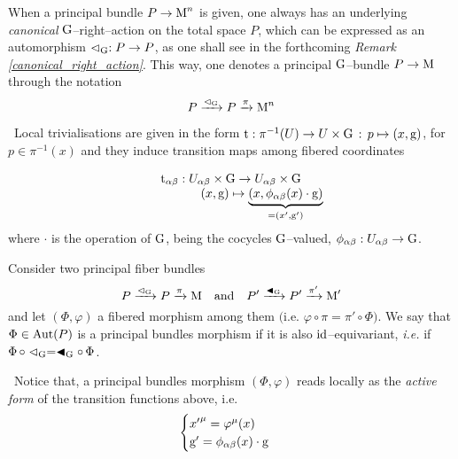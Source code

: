 \begin{note}
    When a principal bundle $P\to\text{\normalfont M}^n$ is given, one always has an underlying \emph{canonical} $\text{\normalfont G}$--right--action on the total space $P$, which can be expressed as an automorphism $\vartriangleleft_{\text{\normalfont G}}:P\to P$, as one shall see in the forthcoming \emph{Remark \ref{canonical_right_action}}. This way, one denotes a principal $\text{\normalfont G}$--bundle $P\to\text{\normalfont M}$ through the notation
    $$P\xrightarrow[]{\vartriangleleft_{\text{\normalfont G}}}P\xrightarrow{\pi}\text{\normalfont M}^n$$
\end{note}

    
\,\newline
Local trivialisations are given in the form $\text{\normalfont t}:\pi^{-1}(U)\to U\times\text{\normalfont G}\,:\,p\mapsto(x,\text{\normalfont g})$, for $p\in\pi^{-1}(x)$ and they induce transition maps among fibered coordinates 

\begin{equation}\label{princ_trans_maps}
    \begin{matrix}
    \text{\normalfont t}_{\alpha\beta}:U_{\alpha\beta}\times\text{\normalfont G}\to U_{\alpha\beta}\times\text{\normalfont G}\\
    \qquad\qquad\quad(x,\text{\normalfont g})\mapsto\underbrace{\left(x,\phi_{\alpha\beta}(x)\cdot\text{\normalfont g}\right)}_{=(x',\text{\normalfont g}')}
\end{matrix}
\end{equation}
where $\cdot$ is the operation of $\text{\normalfont G}$, being the cocycles $\text{\normalfont G}$--valued, $\phi_{\alpha\beta}:U_{\alpha\beta}\to\text{\normalfont G}$. 

\begin{defi}
    Consider two principal fiber bundles $$P\xrightarrow{\vartriangleleft_{\text{\normalfont G}}}P\xrightarrow{\pi}\text{\normalfont M}\quad\text{and}\quad P'\xrightarrow{\blacktriangleleft_{\text{\normalfont G}}}P'\xrightarrow{\pi'}\text{\normalfont M}'$$ and let $(\Phi,\varphi)$ a fibered morphism among them $($i.e. $\varphi\circ\pi=\pi'\circ\Phi)$. We say that $\Phi\in\text{\normalfont Aut}(P)$ is a principal bundles morphism if it is also $\text{\normalfont id}$--equivariant, \emph{i.e.} if $\Phi\,\circ\vartriangleleft_{\text{\normalfont G}}=\blacktriangleleft_{\text{\normalfont G}}\circ\,\Phi$.
\end{defi}
\,\newline
Notice that, a principal bundles morphism $(\Phi,\varphi)$ reads locally as the \emph{active form} of the transition functions above, i.e.
$$\begin{cases}
    {x'}^\mu=\varphi^\mu(x)\\
    \text{\normalfont g}'=\phi_{\alpha\beta}(x)\cdot\text{\normalfont g}
\end{cases}$$

